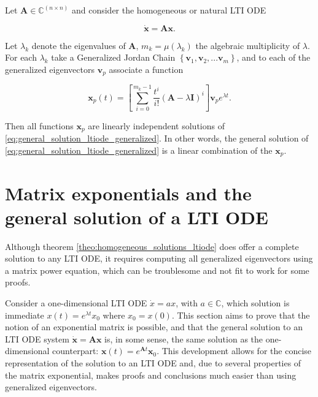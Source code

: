 \begin{corollary} \label{theo:homogeneous_solutions_ltiode} %
	Let $\mathbf{A}\in\mathbb{C}^{(n\times n)}$ and consider the homogeneous or natural LTI ODE

\begin{equation} \dot{\mathbf{x}} = \mathbf{Ax} \label{eq:general_solution_ltiode_generalized} .\end{equation}

	Let $\lambda_k$ denote the eigenvalues of $\mathbf{A}$, $m_k = \mu\left(\lambda_k\right)$ the algebraic multiplicity of $\lambda$. For each $\lambda_k$ take a Generalized Jordan Chain $\left\{\mathbf{v}_1,\mathbf{v}_2,...\mathbf{v}_m\right\}$, and to each of the generalized eigenvectors $\mathbf{v}_p$ associate a function

\begin{equation} \mathbf{x}_p(t) =  \left[\displaystyle\sum\limits_{i=0}^{m_k-1} \dfrac{t^i}{i!}\left(\mathbf{A} - \lambda\mathbf{I}\right)^{i}\right]\mathbf{v}_p e^{\lambda t}. \label{eq:general_solution_ltiode_generalized_sol}\end{equation}

	Then all functions $\mathbf{x}_p$ are linearly independent solutions of \eqref{eq:general_solution_ltiode_generalized}. In other words, the general solution of \eqref{eq:general_solution_ltiode_generalized} is a linear combination of the $\mathbf{x}_p$.
\end{corollary} %

\section{Matrix exponentials and the general solution of a LTI ODE} %

	Although theorem \ref{theo:homogeneous_solutions_ltiode} does offer a complete solution to any LTI ODE, it requires computing all generalized eigenvectors using a matrix power equation, which can be troublesome and not fit to work for some proofs.

	Consider a one-dimensional LTI ODE $\dot{x} = a x$, with $a\in\mathbb{C}$, which solution is immediate $x(t) = e^{\lambda t}x_0$ where $x_0 = x\left(0\right)$. This section aims to prove that the notion of an exponential matrix is possible, and that the general solution to an LTI ODE system $\dot{\mathbf{x}} = \mathbf{Ax}$ is, in some sense, the same solution as the one-dimensional counterpart: $\mathbf{x}(t) = e^{\mathbf{A}t}\mathbf{x}_0$. This development allows for the concise representation of the solution to an LTI ODE and, due to several properties of the matrix exponential, makes proofs and conclusions much easier than using generalized eigenvectors.

